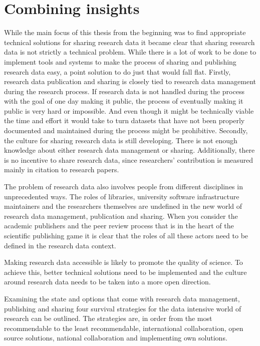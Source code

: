 \section{Combining insights}

While the main focus of this thesis from the beginning was to find
appropriate technical solutions for sharing research data it became clear
that sharing research data is not strictly a technical problem. While there is
a lot of work to be done to implement tools and systems to make the process of
sharing and publishing research data easy, a point solution to do just that
would fall flat. Firstly, research data publication and sharing is closely
tied to research data management during the research process. If research data
is not handled during the process with the goal of one day making it public,
the process of eventually making it public is very hard or impossible. And even
though it might be technically viable the time and effort it would take to
turn datasets that have not been properly documented and maintained during the
process might be prohibitive. Secondly, the culture for sharing research data
is still developing. There is not enough knowledge about either research data management
or sharing. Additionally, there is no incentive to share research data, since
researchers' contribution is measured mainly in citation to research papers.

The problem of research data also involves people from different disciplines
in unprecedented ways. The roles of libraries, university software
infrastructure maintainers and the researchers themselves are undefined in
the new world of research data management, publication and sharing. When you
consider the academic publishers and the peer review process that is in the
heart of the scientific publishing game it is clear that the roles of all
these actors need to be defined in the research data context.

Making research data accessible is likely to promote the quality of science.
To achieve this, better technical solutions need to be implemented and the
culture around research data needs to be taken into a more open direction.

Examining the state and options that come with research data management,
publishing and sharing four survival strategies for the data intensive world
of research can be outlined. The strategies are, in order from the most recommendable
to the least recommendable, international collaboration,
open source solutions, national collaboration and implementing own solutions.

